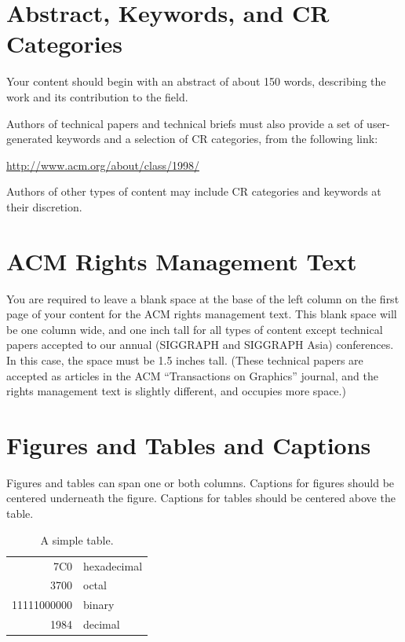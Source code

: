 \documentclass[tog]{acmsiggraph}
\begin{document}
\section{Abstract, Keywords, and CR Categories}

Your content should begin with an abstract of about 150 words,
describing the work and its contribution to the field.

Authors of technical papers and technical briefs must also provide a
set of user-generated keywords and a selection of CR categories, from
the following link:

{\small\url{http://www.acm.org/about/class/1998/}}

Authors of other types of content may include CR categories and
keywords at their discretion.

\section{ACM Rights Management Text}

You are required to leave a blank space at the base of the left column
on the first page of your content for the ACM rights management
text. This blank space will be one column wide, and one inch tall for
all types of content except technical papers accepted to our annual
(SIGGRAPH and SIGGRAPH Asia) conferences. In this case, the space must
be 1.5 inches tall. (These technical papers are accepted as articles
in the ACM ``Transactions on Graphics'' journal, and the rights
management text is slightly different, and occupies more space.)

\section{Figures and Tables and Captions}

Figures and tables can span one or both columns. Captions for figures
should be centered underneath the figure. Captions for tables should
be centered above the table.

\begin{table}[ht]
  \centering
  \caption{A simple table.}
  \begin{tabular}{|r|l|}
    \hline
    7C0 & hexadecimal \\
    3700 & octal \\ \cline{2-2}
    11111000000 & binary \\
    \hline \hline
    1984 & decimal \\
    \hline
  \end{tabular}
\end{table}
  
\end{document}

